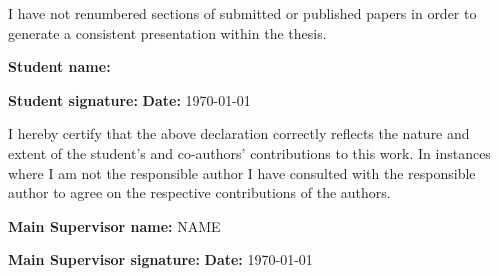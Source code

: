 {I have not renumbered sections of submitted or published papers in order to generate a consistent presentation within the thesis.

\textbf{Student name:} \printThesisAuthor

\ddmmyyyydate

\textbf{Student signature:}\hspace{3mm}%
\hfill%
\textbf{Date:} \today

I hereby certify that the above declaration correctly reflects the nature and extent of the student's and co-authors' contributions to this work. In instances where I am not the responsible author I have consulted with the responsible author to agree on the respective contributions of the authors.

\textbf{Main Supervisor name:} NAME

\textbf{Main Supervisor signature:}\hspace{3mm}%
\hfill%
\textbf{Date:} \today


}